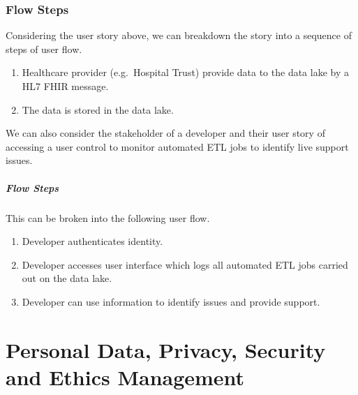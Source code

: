 \documentclass[10pt]{article}
\begin{document}
\subsubsection{Flow Steps}\label{flow-steps-1}

Considering the user story above, we can breakdown the story into a
sequence of steps of user flow.

\begin{enumerate}
\def\labelenumi{\arabic{enumi}.}
\itemsep1pt\parskip0pt
\item
  Healthcare provider (e.g.~Hospital Trust) provide data to the data
  lake by a HL7 FHIR message.
\item
  The data is stored in the data lake.
\end{enumerate}

We can also consider the stakeholder of a developer and their user story	
of accessing a user control to monitor automated ETL jobs to identify	
live support issues.	

\subparagraph{Flow Steps}

This can be broken into the following user flow.	

\begin{enumerate}	
	\def\labelenumi{\arabic{enumi}.}	
	\itemsep1pt\parskip0pt	
	\item	
	Developer authenticates identity.	
	\item	
	Developer accesses user interface which logs all automated ETL jobs	
	carried out on the data lake.	
	\item	
	Developer can use information to identify issues and provide support.	
\end{enumerate}

\newpage
\section{Personal Data, Privacy, Security and Ethics Management}
\end{document}
